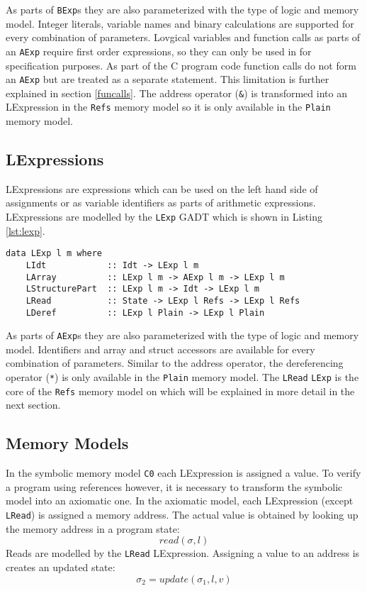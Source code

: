 \documentclass[12pt]{article}
\begin{document}
As parts of \texttt{BExp}s they are also parameterized with the type of logic and memory model.
Integer literals, variable names and binary calculations are supported for every combination of parameters.
Lovgical variables and function calls as parts of an \texttt{AExp} require first order expressions, so they can only be used in for specification purposes. 
As part of the C program code function calls do not form an \texttt{AExp} but are treated as a separate statement.
This limitation is further explained in section \ref{funcalls}.
The address operator (\texttt{\&}) is transformed into an LExpression in the \texttt{Refs} memory model so it is only available in the \texttt{Plain} memory model.

\subsection{LExpressions}
LExpressions are expressions which can be used on the left hand side of assignments or as variable identifiers as parts of arithmetic expressions. LExpressions are modelled by the \texttt{LExp} GADT which is shown in Listing \ref{lst:lexp}.

\begin{lstlisting}[style=c0, caption=LExp, label=lst:lexp]
data LExp l m where
    LIdt            :: Idt -> LExp l m
    LArray          :: LExp l m -> AExp l m -> LExp l m
    LStructurePart  :: LExp l m -> Idt -> LExp l m
    LRead           :: State -> LExp l Refs -> LExp l Refs
    LDeref          :: LExp l Plain -> LExp l Plain
\end{lstlisting}

As parts of \texttt{AExp}s they are also parameterized with the type of logic and memory model.
Identifiers and array and struct accessors are available for every combination of parameters.
Similar to the address operator, the dereferencing operator (\texttt{*}) is only available in the \texttt{Plain} memory model.
The \texttt{LRead} \texttt{LExp} is the core of the \texttt{Refs} memory model on which will be explained in more detail in the next section.


\subsection{Memory Models}
\label{memory_models}
In the symbolic memory model \texttt{C0} each LExpression is assigned a value.
To verify a program using references however, it is necessary to transform the symbolic model into an axiomatic one.
In the axiomatic model, each LExpression (except \texttt{LRead}) is assigned a memory address.
The actual value is obtained by looking up the memory address in a program state:
\[ read(\sigma, l) \]
Reads are modelled by the \texttt{LRead} LExpression.
Assigning a value to an address is creates an updated state:
\[ \sigma_2 = update(\sigma_1, l, v) \]
\end{document}
